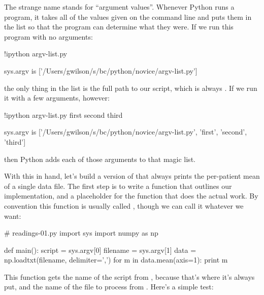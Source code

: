 The strange name  stands for ``argument values''. Whenever
Python runs a program, it takes all of the values given on the command
line and puts them in the list  so that the program can
determine what they were. If we run this program with no arguments:

\begin{VerbIn}
!ipython argv-list.py
\end{VerbIn}

\begin{VerbOut}
sys.argv is ['/Users/gwilson/s/bc/python/novice/argv-list.py']
\end{VerbOut}

the only thing in the list is the full path to our script, which is
always . If we run it with a few arguments,
however:

\begin{VerbIn}
!ipython argv-list.py first second third
\end{VerbIn}

\begin{VerbOut}
sys.argv is ['/Users/gwilson/s/bc/python/novice/argv-list.py', 'first', 'second', 'third']
\end{VerbOut}

then Python adds each of those arguments to that magic list.

With this in hand, let's build a version of  that
always prints the per-patient mean of a single data file. The first step
is to write a function that outlines our implementation, and a
placeholder for the function that does the actual work. By convention
this function is usually called , though we can call it
whatever we want:

\begin{VerbIn}
# readings-01.py
import sys
import numpy as np

def main():
    script = sys.argv[0]
    filename = sys.argv[1]
    data = np.loadtxt(filename, delimiter=',')
    for m in data.mean(axis=1):
        print m
\end{VerbIn}

This function gets the name of the script from ,
because that's where it's always put, and the name of the file to
process from . Here's a simple test:



